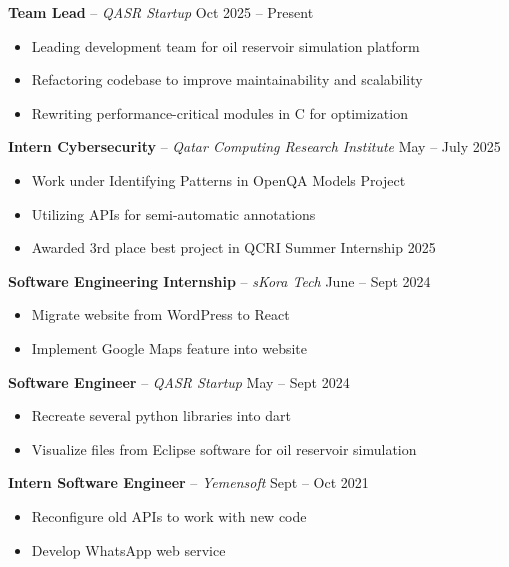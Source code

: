 \documentclass[11pt,a4paper]{article}
\begin{document}
\textbf{Team Lead} -- \textit{QASR Startup} \hfill Oct 2025 -- Present
\begin{itemize}[leftmargin=2em, nosep, label={}]
    \item Leading development team for oil reservoir simulation platform
    \item Refactoring codebase to improve maintainability and scalability
    \item Rewriting performance-critical modules in C for optimization
\end{itemize}

\vspace{4pt}

\textbf{Intern Cybersecurity} -- \textit{Qatar Computing Research Institute} \hfill May -- July 2025
\begin{itemize}[leftmargin=2em, nosep, label={}]
    \item Work under Identifying Patterns in OpenQA Models Project
    \item Utilizing APIs for semi-automatic annotations
    \item Awarded 3rd place best project in QCRI Summer Internship 2025
\end{itemize}

\vspace{4pt}

\textbf{Software Engineering Internship} -- \textit{sKora Tech} \hfill June -- Sept 2024
\begin{itemize}[leftmargin=2em, nosep, label={}]
    \item Migrate website from WordPress to React
    \item Implement Google Maps feature into website
\end{itemize}

\vspace{4pt}

\textbf{Software Engineer} -- \textit{QASR Startup} \hfill May -- Sept 2024
\begin{itemize}[leftmargin=2em, nosep, label={}]
    \item Recreate several python libraries into dart
    \item Visualize files from Eclipse software for oil reservoir simulation
\end{itemize}

\vspace{4pt}

\textbf{Intern Software Engineer} -- \textit{Yemensoft} \hfill Sept -- Oct 2021
\begin{itemize}[leftmargin=2em, nosep, label={}]
    \item Reconfigure old APIs to work with new code
    \item Develop WhatsApp web service
\end{itemize}
\end{document}
